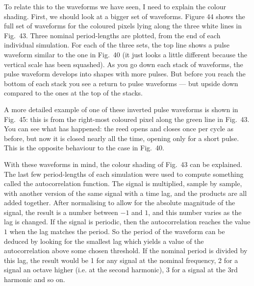   To relate this to the waveforms we have seen, I need to explain the colour 
  shading. First, we should look at a bigger set of waveforms. Figure 44 shows 
  the full set of waveforms for the coloured pixels lying along the three white 
  lines in Fig.\ 43. Three nominal period-lengths are plotted, from the end of 
  each individual simulation. For each of the three sets, the top line shows a 
  pulse waveform similar to the one in Fig.\ 40 (it just looks a little 
  different because the vertical scale has been squashed). As you go down each 
  stack of waveforms, the pulse waveform develops into shapes with more pulses. 
  But before you reach the bottom of each stack you see a return to pulse 
  waveforms — but upside down compared to the ones at the top of the stacks. 


  A more detailed example of one of these inverted pulse waveforms is shown in 
  Fig.\ 45: this is from the right-most coloured pixel along the green line in 
  Fig.\ 43. You can see what has happened: the reed opens and closes once per 
  cycle as before, but now it is closed nearly all the time, opening only for a 
  short pulse. This is the opposite behaviour to the case in Fig.\ 40. 


  With these waveforms in mind, the colour shading of Fig.\ 43 can be 
  explained. The last few period-lengths of each simulation were used to 
  compute something called the autocorrelation function. The signal is 
  multiplied, sample by sample, with another version of the same signal with a 
  time lag, and the products are all added together. After normalising to allow 
  for the absolute magnitude of the signal, the result is a number between $-1$ 
  and $1$, and this number varies as the lag is changed. If the signal is 
  periodic, then the autocorrelation reaches the value $1$ when the lag matches 
  the period. So the period of the waveform can be deduced by looking for the 
  smallest lag which yields a value of the autocorrelation above some chosen 
  threshold. If the nominal period is divided by this lag, the result would be 
  1 for any signal at the nominal frequency, 2 for a signal an octave higher 
  (i.e. at the second harmonic), 3 for a signal at the 3rd harmonic and so on. 

